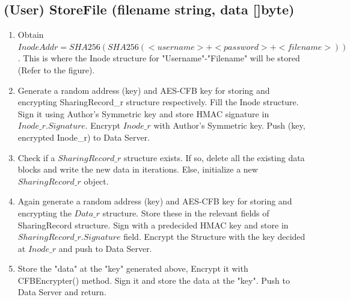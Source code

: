 \documentclass[a4paper, 12pt]{scrartcl}
\begin{document}
\subsection{(User) StoreFile (filename string, data []byte)}
\begin{enumerate}
	\itemsep0em
	\item Obtain $InodeAddr = SHA256 ( SHA256(<username>+<password>+<filename>) )$. This is where the Inode structure for "Username"-"Filename" will be stored (Refer to the figure).
	\item Generate a random address (key) and AES-CFB key for storing and encrypting SharingRecord\_r structure respectively. Fill the Inode structure. Sign it using Author's Symmetric key and store HMAC signature in $Inode\_r.Signature$. Encrypt $Inode\_r$ with Author's Symmetric key. Push (key, encrypted Inode\_r) to Data Server.
	\item Check if a $SharingRecord\_r$ structure exists. If so, delete all the existing data blocks and write the new data in iterations. Else, initialize a new $SharingRecord\_r$ object.
	\item Again generate a random address (key) and AES-CFB key for storing and encrypting the $Data\_r$ structure. Store these in the relevant fields of SharingRecord structure. Sign with a predecided HMAC key and store in $SharingRecord\_r.Signature$ field. Encrypt the Structure with the key decided at $Inode\_r$ and push to Data Server.
	\item Store the "data" at the "key" generated above, Encrypt it with CFBEncrypter() method. Sign it and store the data at the "key". Push to Data Server and return. 
\end{enumerate}
\end{document}
